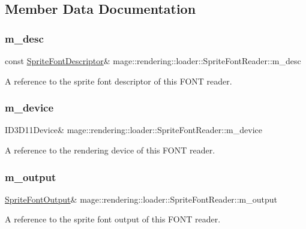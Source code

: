 \subsection{Member Data Documentation}
\hypertarget{classmage_1_1rendering_1_1loader_1_1_sprite_font_reader_af346b7f0f090f5c9994d60684ccb5960}{}\label{classmage_1_1rendering_1_1loader_1_1_sprite_font_reader_af346b7f0f090f5c9994d60684ccb5960} 
\subsubsection{\texorpdfstring{m\+\_\+desc}{m\_desc}}
{\footnotesize\ttfamily const \hyperlink{classmage_1_1rendering_1_1_sprite_font_descriptor}{Sprite\+Font\+Descriptor}\& mage\+::rendering\+::loader\+::\+Sprite\+Font\+Reader\+::m\+\_\+desc\hspace{0.3cm}{\ttfamily [private]}}

A reference to the sprite font descriptor of this F\+O\+NT reader. \hypertarget{classmage_1_1rendering_1_1loader_1_1_sprite_font_reader_a2d152614490f697a9d737aae446a84c9}{}\label{classmage_1_1rendering_1_1loader_1_1_sprite_font_reader_a2d152614490f697a9d737aae446a84c9} 
\subsubsection{\texorpdfstring{m\+\_\+device}{m\_device}}
{\footnotesize\ttfamily I\+D3\+D11\+Device\& mage\+::rendering\+::loader\+::\+Sprite\+Font\+Reader\+::m\+\_\+device\hspace{0.3cm}{\ttfamily [private]}}

A reference to the rendering device of this F\+O\+NT reader. \hypertarget{classmage_1_1rendering_1_1loader_1_1_sprite_font_reader_ab14aaeb914ddc7f448ae8fe5ce021d3a}{}\label{classmage_1_1rendering_1_1loader_1_1_sprite_font_reader_ab14aaeb914ddc7f448ae8fe5ce021d3a} 
\subsubsection{\texorpdfstring{m\+\_\+output}{m\_output}}
{\footnotesize\ttfamily \hyperlink{structmage_1_1rendering_1_1_sprite_font_output}{Sprite\+Font\+Output}\& mage\+::rendering\+::loader\+::\+Sprite\+Font\+Reader\+::m\+\_\+output\hspace{0.3cm}{\ttfamily [private]}}

A reference to the sprite font output of this F\+O\+NT reader. 
